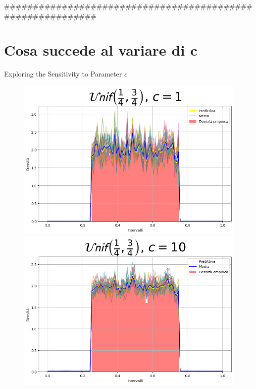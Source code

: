 \documentclass{beamer}
\begin{document}
###########################################################
\section{Cosa succede al variare di c}
\begin{frame}{Exploring the Sensitivity to Parameter \(c\)}
    \centering
    \begin{figure}
        \begin{minipage}{0.32\textwidth}
            \centering
            \includegraphics[width=\textwidth]{Unifc1.png}
        \end{minipage}
        \hfill
        \begin{minipage}{0.32\textwidth}
            \centering
            \includegraphics[width=\textwidth]{Unifc10.png}

\end{minipage}
\end{figure}
\end{frame}
\end{document}
